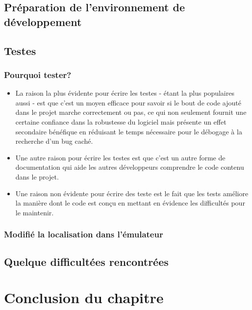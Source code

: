 \subsection{Préparation de l'environnement de développement}%
\subsection{Testes}
\subsubsection{Pourquoi tester?~\cite{pycon:getting_started_with_automated_testing}}
\begin{itemize}
\item La raison la plus évidente pour écrire les testes - étant la plus populaires aussi - est que c'est un moyen efficace pour savoir si le bout de code ajouté dans le projet marche correctement ou pas, ce qui non seulement fournit une certaine confiance dans la robustesse du logiciel mais présente un effet secondaire bénéfique en réduisant le temps nécessaire pour le débogage à la recherche d'un bug caché. %
\item Une autre raison pour écrire les testes est que c'est un autre forme de documentation qui aide les autres développeurs comprendre le code contenu dans le projet.
\item Une raison non évidente pour écrire des teste est le fait que les tests améliore la manière dont le code est conçu en mettant en évidence les difficultés pour le maintenir.
\end{itemize}
\subsubsection{Modifié la localisation dans l'émulateur}%

\subsection{Quelque difficultées rencontrées}

\section{Conclusion du chapitre}